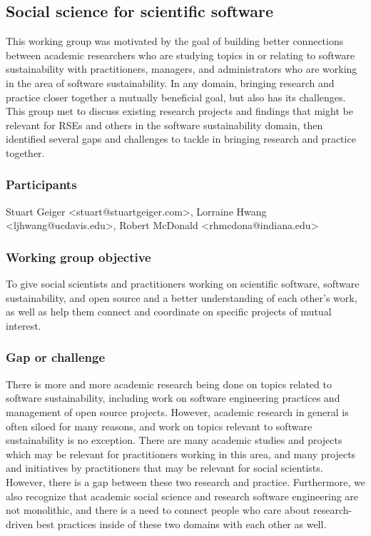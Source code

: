 \subsection{Social science for scientific software}
\label{sec:social}



This working group was motivated by the goal of building better connections between academic researchers who are studying topics in or relating to software sustainability with practitioners, managers, and administrators who are working in the area of software sustainability. In any domain, bringing research and practice closer together a mutually beneficial goal, but also has its challenges. This group met to discuss existing research projects and findings that might be relevant for RSEs and others in the software sustainability domain, then identified several gaps and challenges to tackle in bringing research and practice together.

\subsubsection{Participants}

Stuart Geiger <stuart@stuartgeiger.com>, Lorraine Hwang <ljhwang@ucdavis.edu>, Robert McDonald <rhmcdona@indiana.edu>

\subsubsection{Working group objective}

To give social scientists and practitioners working on scientific software, software sustainability, and open source and a better understanding of each other's work, as well as help them connect and coordinate on specific projects of mutual interest.

\subsubsection{Gap or challenge}

There is more and more academic research being done on topics related to software sustainability, including work on software engineering practices and management of open source projects. However, academic research in general is often siloed for many reasons, and work on topics relevant to software sustainability is no exception. There are many academic studies and projects which may be relevant for practitioners working in this area, and many projects and initiatives by practitioners that may be relevant for social scientists. However, there is a gap between these two research and practice. Furthermore, we also recognize that academic social science and research software engineering are not monolithic, and there is a need to connect people who care about research-driven best practices inside of these two domains with each other as well.


